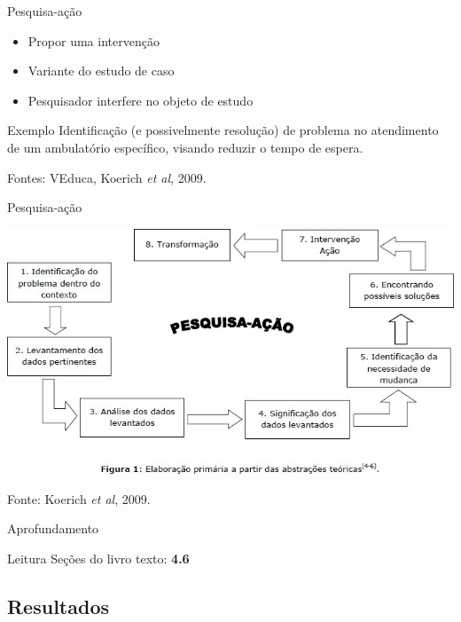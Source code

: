 \documentclass{beamer}
\begin{document}
\begin{frame}{Pesquisa-ação}
  \begin{itemize}
    \footnotesize
  \item Propor uma \alert{intervenção}
  \item Variante do estudo de caso
  \item Pesquisador interfere no objeto de estudo
  \end{itemize}
  \begin{exampleblock}{Exemplo}
    \scriptsize
    Identificação (e possivelmente resolução) de problema no
    atendimento de um ambulatório específico, visando reduzir o tempo
    de espera.
  \end{exampleblock}

  \vfill
  \scriptsize
  Fontes: VEduca, Koerich {\em et al}, 2009.
\end{frame}

\begin{frame}{Pesquisa-ação}
  \begin{center}
    \includegraphics[width=\textwidth]{EstruturaI/pesquisa-acao}
  \end{center}

  \vfill
  \scriptsize
  Fonte: Koerich {\em et al}, 2009.
\end{frame}

\begin{frame}{Aprofundamento}
  \begin{block}{Leitura}
    Seções do livro texto: {\bf 4.6}
  \end{block}
\end{frame}

\subsection{Resultados}
\end{document}
